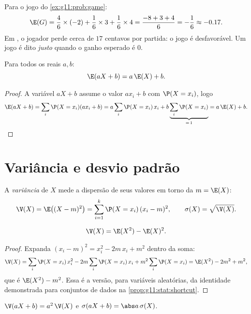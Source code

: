 \begin{example}\label{ex:g11:prob:gameexp}
Para o jogo do \cref{ex:g11:prob:game}:
\[
\E(G) = \frac46 \times (-2) + \frac16 \times 3 + \frac16 \times 4
= \frac{-8 + 3 + 4}{6} = -\frac16 \approx -0.17 .
\]
Em , o jogador perde cerca de $17$ centavos por partida: o jogo é
desfavorável. Um jogo é dito \emph{justo} quando o ganho esperado é $0$.
\end{example}

\begin{proposition}[Linearidade]\label{prop:g11:prob:linearity}
Para todos os reais $a, b$:
\[
\E(aX + b) = a\,\E(X) + b .
\]
\end{proposition}

\begin{proof}
A variável $aX + b$ assume o valor $a x_i + b$ com 
$\P(X = x_i)$, logo
\[
\E(aX + b) = \sum_i \P(X = x_i)(a x_i + b)
= a \sum_i \P(X = x_i)\,x_i + b \underbrace{\sum_i \P(X =
x_i)}_{=\,1} = a\,\E(X) + b .
\]
\end{proof}

\section{Variância e desvio padrão}

\begin{definition}[Variância]\label{def:g11:prob:variance}
A \emph{variância} de $X$ mede a dispersão de seus
valores em torno da  $m = \E(X)$:
\[
\V(X) = \E\bigl((X - m)^2\bigr)
= \sum_{i=1}^{k} \P(X = x_i)\,(x_i - m)^2,
\qquad
\sigma(X) = \sqrt{\V(X)} .
\]
\end{definition}

\begin{proposition}\label{prop:g11:prob:konig}
\[
\V(X) = \E(X^2) - \E(X)^2 .
\]
\end{proposition}

\begin{proof}
Expanda $(x_i - m)^2 = x_i^2 - 2m\,x_i + m^2$ dentro da soma:
\[
\V(X) = \sum_i \P(X = x_i)\,x_i^2
- 2m \sum_i \P(X = x_i)\,x_i + m^2\sum_i \P(X = x_i)
= \E(X^2) - 2m^2 + m^2 ,
\]
que é $\E(X^2) - m^2$. Essa é a versão, para variáveis aleatórias, da
identidade demonstrada para conjuntos de dados na
\cref{prop:g11:stat:shortcut}.
\end{proof}

\begin{proposition}\label{prop:g11:prob:affine}
$\V(aX + b) = a^2\,\V(X)$ e $\sigma(aX + b) = \abs a\,\sigma(X)$.
\end{proposition}

